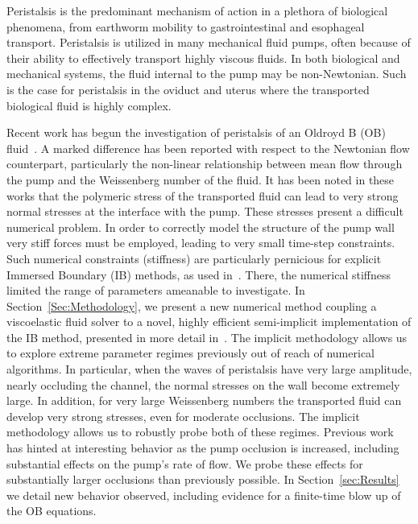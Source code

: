 Peristalsis is the predominant mechanism of action in a plethora of biological phenomena, from earthworm mobility to gastrointestinal and esophageal transport. Peristalsis is utilized in many mechanical fluid pumps, often because of their ability to effectively transport highly viscous fluids. In both biological and mechanical systems,  the fluid internal to the pump may be non-Newtonian. Such is the case for peristalsis in the oviduct and uterus where the transported biological fluid is highly complex.

Recent work has begun the investigation of peristalsis of an Oldroyd B (OB) fluid~\cite{teran2008peristaltic, chrispell2010peristaltic}. 
A marked difference has been reported with respect to the Newtonian flow counterpart, particularly the non-linear relationship between mean flow through the pump and the Weissenberg number of the fluid. It has been noted in these works that the polymeric stress of the transported fluid can lead to very strong normal stresses at the interface with the pump. These stresses present a difficult numerical problem. In order to correctly model the structure of the pump wall very stiff forces must be employed, leading to very small time-step constraints. Such numerical constraints (stiffness) are particularly pernicious for explicit Immersed Boundary (IB) methods, as used in~\cite{teran2008peristaltic, chrispell2010peristaltic}. There,  the numerical stiffness  limited the range of parameters ameanable to investigate. In Section~\ref{Sec:Methodology},  we present a new numerical method coupling a viscoelastic fluid solver to a novel, highly efficient semi-implicit implementation of the IB method, presented in more detail in~\cite{IBM_Implicit2D, IBM_Implicit3D}. The implicit methodology allows us to explore extreme parameter regimes previously out of reach of numerical algorithms. In particular, when the waves of peristalsis have very large amplitude, nearly occluding the channel, the normal stresses on the wall become extremely large. In addition, for very large Weissenberg numbers the transported fluid can develop very strong stresses, even for moderate occlusions. The implicit methodology allows us to robustly probe both of these regimes. Previous work has hinted at interesting behavior as the pump occlusion is increased, including substantial effects on the pump's rate of flow. We probe these effects  for substantially larger occlusions than previously possible. In Section~\ref{sec:Results} we detail new behavior observed, including evidence for a finite-time blow up of the OB equations.

